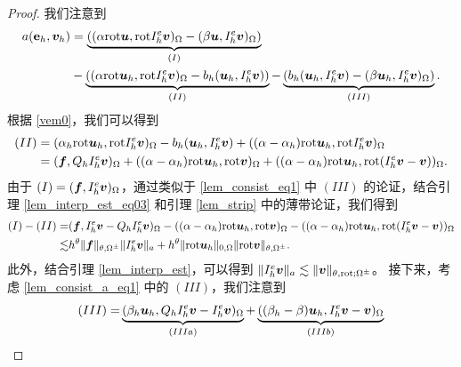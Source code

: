 \begin{proof}
我们注意到
\begin{equation}
\begin{split}
\label{lem_consist_a_eq1}
a(\mathbf{e}_h, \boldsymbol{v}_h ) & = \underbrace{( (\alpha \mathrm{rot} \boldsymbol{u}, \mathrm{rot} I^e_h\boldsymbol{v})_{\Omega}  - (\beta \boldsymbol{u}, I^e_h\boldsymbol{v})_{\Omega} )}_{(I)} \\
&  - \underbrace{ ( (\alpha \mathrm{rot} \boldsymbol{u}_h, \mathrm{rot} I^e_h\boldsymbol{v})_{\Omega}  - b_h(\boldsymbol{u}_h, I^e_h\boldsymbol{v}) ) }_{(II)}  - \underbrace{ ( b_h(\boldsymbol{u}_h, I^e_h\boldsymbol{v}) - (\beta  \boldsymbol{u}_h, I^e_h\boldsymbol{v} )_{\Omega}) }_{(III)}.
\end{split}
\end{equation}
根据 \eqref{vem0}，我们可以得到
\begin{equation}
\begin{split}
\label{lem_consist_a_eq2}
(II) & = (\alpha_h \mathrm{rot} \boldsymbol{u}_h, \mathrm{rot} I^e_h\boldsymbol{v} )_{\Omega}  - b_h(\boldsymbol{u}_h, I^e_h\boldsymbol{v}) + ( (\alpha-\alpha_h) \mathrm{rot} \boldsymbol{u}_h, \mathrm{rot} I^e_h\boldsymbol{v})_{\Omega} \\
& = (\boldsymbol{f}, Q_h I^e_h\boldsymbol{v} )_{\Omega} + ( (\alpha-\alpha_h) \mathrm{rot} \boldsymbol{u}_h, \mathrm{rot} \boldsymbol{v})_{\Omega}  + ( (\alpha-\alpha_h) \mathrm{rot} \boldsymbol{u}_h, \mathrm{rot} (I^e_h\boldsymbol{v} - \boldsymbol{v}) )_{\Omega}.
\end{split}
\end{equation}
由于 $(I) = (\boldsymbol{f}, I^e_h\boldsymbol{v})_{\Omega}$，通过类似于 \eqref{lem_consist_eq1} 中 $(III)$ 的论证，结合引理 \ref{lem_interp_est_eq03} 和引理 \ref{lem_strip} 中的薄带论证，我们得到
\begin{equation}
\begin{split}
\label{lem_consist_a_eq3}
(I) - (II)  = & (\boldsymbol{f} , I^e_h\boldsymbol{v} - Q_h I^e_h\boldsymbol{v})_{\Omega}  -  ( (\alpha-\alpha_h) \mathrm{rot} \boldsymbol{u}_h, \mathrm{rot} \boldsymbol{v})_{\Omega}  - ( (\alpha-\alpha_h) \mathrm{rot} \boldsymbol{u}_h, \mathrm{rot} (I^e_h\boldsymbol{v} - \boldsymbol{v}) )_{\Omega} \\
\lesssim &  h^{\theta}  \| \boldsymbol{f} \|_{\theta,\Omega^{\pm}} \|  I^e_h\boldsymbol{v} \|_{a} +  h^{\theta}  \| \mathrm{rot} \boldsymbol{u}_h \|_{0,\Omega} \| \mathrm{rot}\boldsymbol{v} \|_{\theta,\Omega^{\pm}} .
\end{split}
\end{equation}
此外，结合引理 \ref{lem_interp_est}，可以得到 $\| I^e_h \boldsymbol{v} \|_a \lesssim \| \boldsymbol{v} \|_{\theta,\mathrm{rot};\Omega^{\pm}}$。
接下来，考虑 \eqref{lem_consist_a_eq1} 中的 $(III)$，我们注意到
\begin{equation}
\begin{split}
\label{lem_consist_a_eq4}
(III) = & \underbrace{ (\beta_h  \bu_h, Q_h I^e_h \bv - I^e_h \bv)_{\Omega} }_{(IIIa)} + \underbrace{ ( (\beta_h - \beta)\bu_h, I^e_h \bv - \bv )_{\Omega} }_{(IIIb)}\\

\end{split}
\end{equation}
\end{proof}
